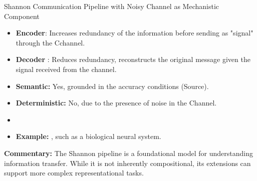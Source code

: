 \documentclass[10pt, aspectratio=169]{beamer}
\begin{document}
\begin{frame}{Shannon Communication Pipeline with Noisy Channel as Mechanistic Component}
\begin{itemize}
                    \item \textbf{Encoder}: Increases redundancy of the information before sending as "signal" through the Cchannel.
                    \item \textbf{Decoder }: Reduces redundancy, reconstructs the original message given the signal received from the channel.
                    \item \textbf{Semantic:} Yes, grounded in the accuracy conditions (Source).
                    \item \textbf{Deterministic:} No, due to the presence of noise in the Channel.
                    \item 
                    \item \textbf{Example:} , such as a biological neural system.
                \end{itemize}

                \vspace{0.5cm}
                \textbf{Commentary:} The Shannon pipeline is a foundational model for understanding information transfer. While it is not inherently compositional, its extensions can support more complex representational tasks.
        \end{frame}
\end{document}

